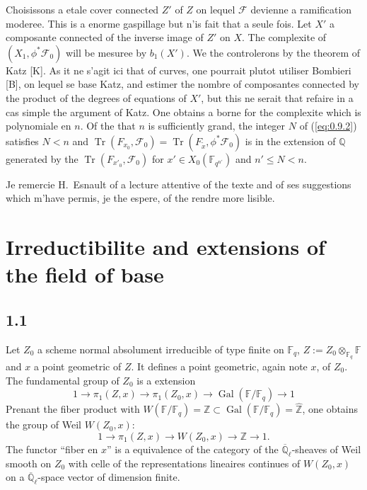 \documentclass[11pt,a4paper]{article}
\theoremstyle{plain}
\theoremstyle{definition}
\DeclareMathOperator{\Gal}{Gal}
\DeclareMathOperator{\tr}{Tr}
\begin{document}
Choisissons a etale cover connected $Z'$ of $Z$ on lequel $\mathcal{F}$ devienne a ramification moderee. This is a enorme gaspillage but n'is fait that a seule fois. Let $X'$ a composante connected of the inverse image of $Z'$ on $X$. The complexite of $(X_1, \phi^* \mathcal{F}_0)$ will be mesuree by $b_1(X')$. We the controlerons by the theorem of Katz [K]. As it ne s'agit ici that of curves, one pourrait plutot utiliser Bombieri [B], on lequel se base Katz, and estimer the nombre of composantes connected by the product of the degrees of equations of $X'$, but this ne serait that refaire in a cas simple the argument of Katz. One obtains a borne for the complexite which is polynomiale en $n$. Of the that $n$ is sufficiently grand, the integer $N$ of (\ref{eq:0.9.2}) satisfies $N < n$ and $\tr(F_{x_0}, \mathcal{F}_0) = \tr(F_{\tilde{x}}, \phi^* \mathcal{F}_0)$ is in the extension of $\mathbb{Q}$ generated by the $\tr(F_{x'_0}, \mathcal{F}_0)$ for $x' \in X_0(\mathbb{F}_{q^{n'}})$ and $n' \leq N < n$.

Je remercie H.~Esnault of a lecture attentive of the texte and of ses suggestions which m'have permis, je the espere, of the rendre more lisible.

\section{Irreductibilite and extensions of the field of base}

\subsection{1.1}

Let $Z_0$ a scheme normal absolument irreducible of type finite on $\mathbb{F}_q$, $Z := Z_0 \otimes_{\mathbb{F}_q} \mathbb{F}$ and $x$ a point geometric of $Z$. It defines a point geometric, again note $x$, of $Z_0$. The fundamental group of $Z_0$ is a extension
\[
1 \to \pi_1(Z,x) \to \pi_1(Z_0,x) \to \Gal(\mathbb{F}/\mathbb{F}_q) \to 1
\]
Prenant the fiber product with $W(\mathbb{F}/\mathbb{F}_q) = \mathbb{Z} \subset \Gal(\mathbb{F}/\mathbb{F}_q) = \hat{\mathbb{Z}}$, one obtains the group of Weil $W(Z_0,x)$:
\[
1 \to \pi_1(Z,x) \to W(Z_0,x) \to \mathbb{Z} \to 1.
\]
The functor ``fiber en $x$'' is a equivalence of the category of the $\overline{\mathbb{Q}}_\ell$-sheaves of Weil smooth on $Z_0$ with celle of the representations lineaires continues of $W(Z_0,x)$ on a $\overline{\mathbb{Q}}_\ell$-space vector of dimension finite.
\end{document}
